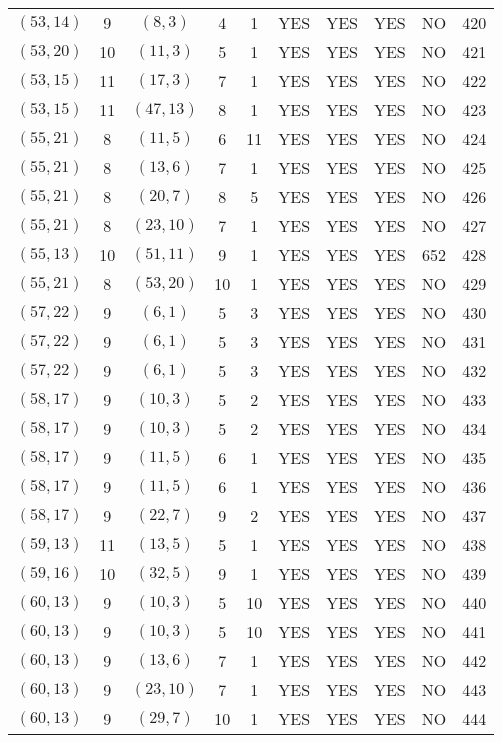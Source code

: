 \begin{longtable}{|c|c|c|c|c|c|c|c|c|c|}
$(53, 14)$ & 9 & $(8, 3)$ & 4 & 1 & YES & YES & YES & NO & 420\\
$(53, 20)$ & 10 & $(11, 3)$ & 5 & 1 & YES & YES & YES & NO & 421\\
$(53, 15)$ & 11 & $(17, 3)$ & 7 & 1 & YES & YES & YES & NO & 422\\
$(53, 15)$ & 11 & $(47, 13)$ & 8 & 1 & YES & YES & YES & NO & 423\\
$(55, 21)$ & 8 & $(11, 5)$ & 6 & 11 & YES & YES & YES & NO & 424\\
$(55, 21)$ & 8 & $(13, 6)$ & 7 & 1 & YES & YES & YES & NO & 425\\
$(55, 21)$ & 8 & $(20, 7)$ & 8 & 5 & YES & YES & YES & NO & 426\\
$(55, 21)$ & 8 & $(23, 10)$ & 7 & 1 & YES & YES & YES & NO & 427\\
$(55, 13)$ & 10 & $(51, 11)$ & 9 & 1 & YES & YES & YES & 652 & 428\\
$(55, 21)$ & 8 & $(53, 20)$ & 10 & 1 & YES & YES & YES & NO & 429\\
$(57, 22)$ & 9 & $(6, 1)$ & 5 & 3 & YES & YES & YES & NO & 430\\
$(57, 22)$ & 9 & $(6, 1)$ & 5 & 3 & YES & YES & YES & NO & 431\\
$(57, 22)$ & 9 & $(6, 1)$ & 5 & 3 & YES & YES & YES & NO & 432\\
$(58, 17)$ & 9 & $(10, 3)$ & 5 & 2 & YES & YES & YES & NO & 433\\
$(58, 17)$ & 9 & $(10, 3)$ & 5 & 2 & YES & YES & YES & NO & 434\\
$(58, 17)$ & 9 & $(11, 5)$ & 6 & 1 & YES & YES & YES & NO & 435\\
$(58, 17)$ & 9 & $(11, 5)$ & 6 & 1 & YES & YES & YES & NO & 436\\
$(58, 17)$ & 9 & $(22, 7)$ & 9 & 2 & YES & YES & YES & NO & 437\\
$(59, 13)$ & 11 & $(13, 5)$ & 5 & 1 & YES & YES & YES & NO & 438\\
$(59, 16)$ & 10 & $(32, 5)$ & 9 & 1 & YES & YES & YES & NO & 439\\
$(60, 13)$ & 9 & $(10, 3)$ & 5 & 10 & YES & YES & YES & NO & 440\\
$(60, 13)$ & 9 & $(10, 3)$ & 5 & 10 & YES & YES & YES & NO & 441\\
$(60, 13)$ & 9 & $(13, 6)$ & 7 & 1 & YES & YES & YES & NO & 442\\
$(60, 13)$ & 9 & $(23, 10)$ & 7 & 1 & YES & YES & YES & NO & 443\\
$(60, 13)$ & 9 & $(29, 7)$ & 10 & 1 & YES & YES & YES & NO & 444\\

\end{longtable}
